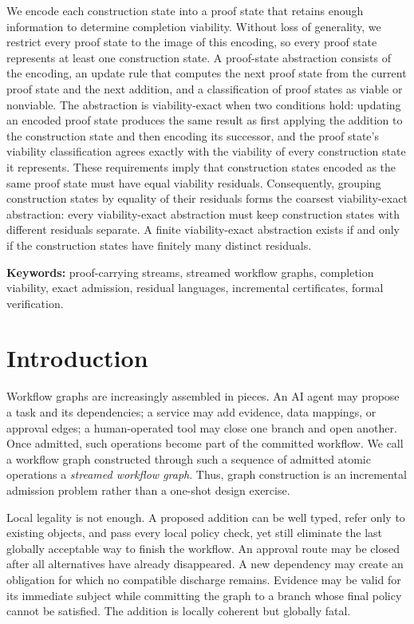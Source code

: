 \documentclass[11pt]{article}
\theoremstyle{definition}
\renewenvironment{abstract}
  {{\centering\bfseries Abstract\par}%
   \vspace{0.15em}%
   \small
   \setlength{\topsep}{0pt}%
   \quotation
   \setlength{\parskip}{0.2em plus 0.05em}}
  {\endquotation\clearpage}
\newcommand{\OpusKeywordSkip}{\vspace{0.3em}}
\begin{document}
\begin{abstract}
We encode each construction state into a proof state that retains enough information to determine completion viability. Without loss of generality, we restrict every proof state to the image of this encoding, so every proof state represents at least one construction state. A proof-state abstraction consists of the encoding, an update rule that computes the next proof state from the current proof state and the next addition, and a classification of proof states as viable or nonviable. The abstraction is viability-exact when two conditions hold: updating an encoded proof state produces the same result as first applying the addition to the construction state and then encoding its successor, and the proof state's viability classification agrees exactly with the viability of every construction state it represents. These requirements imply that construction states encoded as the same proof state must have equal viability residuals. Consequently, grouping construction states by equality of their residuals forms the coarsest viability-exact abstraction: every viability-exact abstraction must keep construction states with different residuals separate. A finite viability-exact abstraction exists if and only if the construction states have finitely many distinct residuals.


\OpusKeywordSkip
\noindent\textbf{Keywords:} proof-carrying streams, streamed workflow graphs, completion viability, exact admission, residual languages, incremental certificates, formal verification.
\end{abstract}

\section{Introduction}\label{sec:introduction}

Workflow graphs are increasingly assembled in pieces. An AI agent may propose a task and its dependencies; a service may add evidence, data mappings, or approval edges; a human-operated tool may close one branch and open another. Once admitted, such operations become part of the committed workflow. We call a workflow graph constructed through such a sequence of admitted atomic operations a \emph{streamed workflow graph}. Thus, graph construction is an incremental admission problem rather than a one-shot design exercise.

Local legality is not enough. A proposed addition can be well typed, refer only to existing objects, and pass every local policy check, yet still eliminate the last globally acceptable way to finish the workflow. An approval route may be closed after all alternatives have already disappeared. A new dependency may create an obligation for which no compatible discharge remains. Evidence may be valid for its immediate subject while committing the graph to a branch whose final policy cannot be satisfied. The addition is locally coherent but globally fatal.
\end{document}
